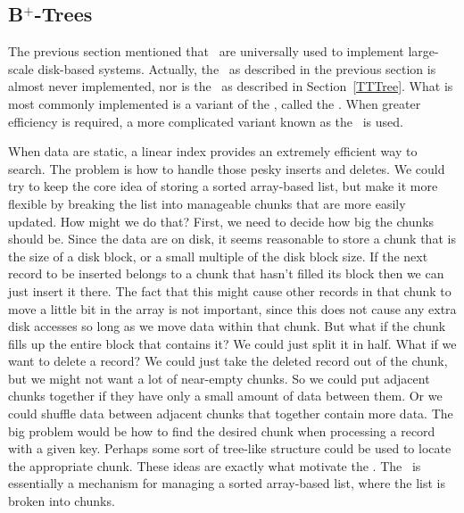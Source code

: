 \subsection{B$^+$-Trees}
\label{BPlusTree}

The previous section mentioned that \Btrees\ are universally used
to implement large-scale disk-based systems.
Actually, the \Btree\ as described in the previous section is almost
never implemented,  nor is the \TTtree\ as described in
Section~\ref{TTTree}.
What is most commonly implemented is a variant of the \Btree,
called the \BPtree.
When greater efficiency is required, a more complicated
variant known as the \BStree\ is used.

When data are static, a linear index provides an extremely efficient
way to search.
The problem is how to handle those pesky inserts and deletes.
We could try to keep the core idea of storing a sorted array-based
list, but make it more flexible by breaking the list into manageable
chunks that are more easily updated.
How might we do that?
First, we need to decide how big the chunks should be.
Since the data are on disk, it seems reasonable to store a chunk that
is the size of a disk block, or a small multiple of the disk block
size.
If the next record to be inserted belongs to a chunk that hasn't
filled its block then we can just insert it there.
The fact that this might cause other records in that chunk to move a
little bit in the array is not important, since this does not cause
any extra disk accesses so long as we move data within that chunk.
But what if the chunk fills up the entire block that contains it?
We could just split it in half.
What if we want to delete a record?
We could just take the deleted record out of the chunk, but we might
not want a lot of near-empty chunks.
So we could put adjacent chunks together if they have only a small
amount of data between them.
Or we could shuffle data between adjacent chunks that together contain
more data.
The big problem would be how to find the desired chunk when processing
a record with a given key.
Perhaps some sort of tree-like structure could be used to locate the
appropriate chunk.
These ideas are exactly what motivate the \BPtree.
The \BPtree\ is essentially a mechanism for managing a sorted
array-based list, where the list is broken into chunks.

